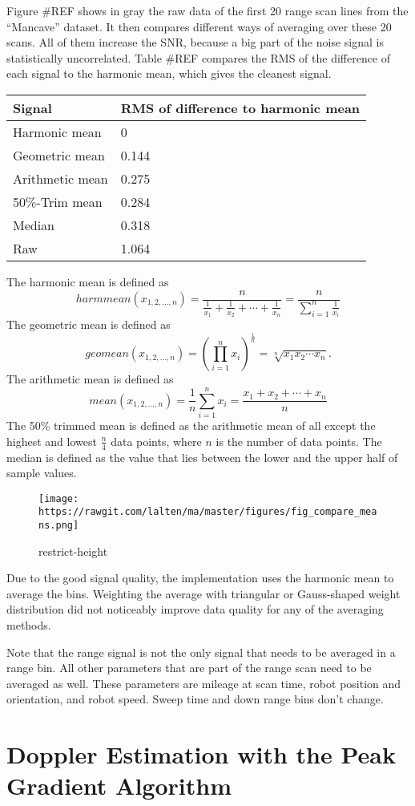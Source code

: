 Figure \#REF shows in gray the raw data of the first 20 range scan lines
from the ``Mancave'' dataset. It then compares different ways of
averaging over these 20 scans. All of them increase the SNR, because a
big part of the noise signal is statistically uncorrelated. Table \#REF
compares the RMS of the difference of each signal to the harmonic mean,
which gives the cleanest signal.

\begin{longtable}[]{@{}ll@{}}
\toprule
Signal & RMS of difference to harmonic mean\tabularnewline
\midrule
\endhead
Harmonic mean & 0\tabularnewline
Geometric mean & 0.144\tabularnewline
Arithmetic mean & 0.275\tabularnewline
50\%-Trim mean & 0.284\tabularnewline
Median & 0.318\tabularnewline
Raw & 1.064\tabularnewline
\bottomrule
\end{longtable}

The harmonic mean is defined as
\[harmmean(x_{1,2,...,n}) = \frac{n}{\frac1{x_1} + \frac1{x_2} + \cdots + \frac1{x_n}} = \frac{n}{\sum\limits_{i=1}^n \frac1{x_i}}\]
The geometric mean is defined as
\[geomean(x_{1,2,...,n}) = \left(\prod_{i=1}^n x_i \right)^\frac{1}{n} = \sqrt[n]{x_1 x_2 \cdots x_n}.\]
The arithmetic mean is defined as
\[mean(x_{1,2,...,n}) = \frac{1}{n}\sum_{i=1}^n x_i=\frac{x_1+x_2+\cdots+x_n}{n}\]
The 50\% trimmed mean is defined as the arithmetic mean of all except
the highest and lowest \(\frac{n}4\) data points, where \(n\) is the
number of data points. The median is defined as the value that lies
between the lower and the upper half of sample values.

\begin{figure}
\centering
\texttt{[image: https://rawgit.com/lalten/ma/master/figures/fig\_compare\_means.png]}
\caption{restrict-height}
\end{figure}

Due to the good signal quality, the implementation uses the harmonic
mean to average the bins. Weighting the average with triangular or
Gauss-shaped weight distribution did not noticeably improve data quality
for any of the averaging methods.

Note that the range signal is not the only signal that needs to be
averaged in a range bin. All other parameters that are part of the range
scan need to be averaged as well. These parameters are mileage at scan
time, robot position and orientation, and robot speed. Sweep time and
down range bins don't change.

\section{Doppler Estimation with the Peak Gradient
Algorithm}\label{doppler-estimation-with-the-peak-gradient-algorithm}

